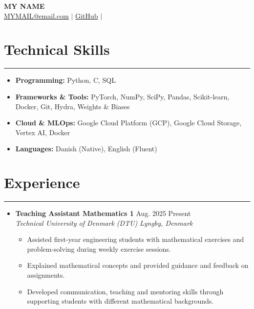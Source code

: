 \documentclass[letterpaper, 10pt]{article}
\begin{document}
\begin{center}
\textbf{\LARGE MY NAME} \\ \vspace{2pt}
\href{mailto:yourmail@email.com}{MYMAIL@email.com} $|$
\href{https://github.com/yourid}{GitHub} $|$
\end{center}

\section*{Technical Skills}
\hrule
\vspace{4pt}
\begin{itemize}
\item[] \textbf{Programming:} Python, C, SQL
\item[] \textbf{Frameworks \& Tools:} PyTorch, NumPy, SciPy,
  Pandas, Scikit-learn, Docker, Git, Hydra, Weights \& Biases
\item[] \textbf{Cloud \& MLOps:} Google Cloud Platform (GCP),
  Google Cloud Storage, Vertex AI, Docker
\item[] \textbf{Languages:} Danish (Native), English (Fluent)
\end{itemize}

\section*{Experience}
\hrule
\vspace{4pt}
\begin{itemize}
\item[]
\textbf{Teaching Assistant Mathematics 1}
\hfill Aug. 2025  Present \\
\textit{Technical University of Denmark (DTU)}
\hfill \textit{Lyngby, Denmark}
\begin{itemize}
    \item Assisted first-year engineering students with
    mathematical exercises and problem-solving during weekly exercise sessions.
    \item Explained mathematical concepts and provided  guidance and feedback on assignments.
    \item Developed communication, teaching and mentoring skills through supporting students with different
    mathematical backgrounds.
\end{itemize}
\end{itemize}

\end{document}
